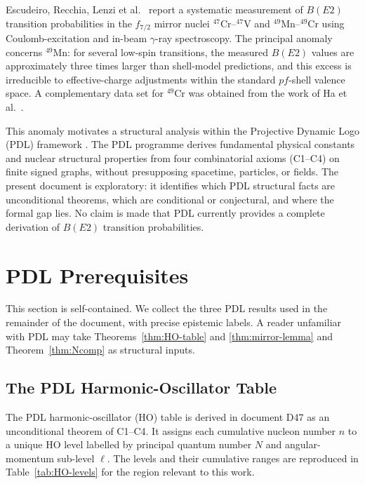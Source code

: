 \documentclass[12pt,a4paper]{article}
\theoremstyle{remark}
\begin{document}
Escudeiro, Recchia, Lenzi et al.\ \cite{Escudeiro_2026} report a systematic measurement of $B(E2)$ transition probabilities in the $f_{7/2}$ mirror nuclei $^{47}$Cr--$^{47}$V and $^{49}$Mn--$^{49}$Cr using Coulomb-excitation and in-beam $\gamma$-ray spectroscopy. The principal anomaly concerns $^{49}$Mn: for several low-spin transitions, the measured $B(E2)$ values are approximately three times larger than shell-model predictions, and this excess is irreducible to effective-charge adjustments within the standard $pf$-shell valence space. A complementary data set for $^{49}$Cr was obtained from the work of Ha et al.\ \cite{Ha_2021}.

This anomaly motivates a structural analysis within the Projective Dynamic Logo (PDL) framework \cite{DM_v24}. The PDL programme derives fundamental physical constants and nuclear structural properties from four combinatorial axioms (C1--C4) on finite signed graphs, without presupposing spacetime, particles, or fields. The present document is exploratory: it identifies which PDL structural facts are unconditional theorems, which are conditional or conjectural, and where the formal gap lies. No claim is made that PDL currently provides a complete derivation of $B(E2)$ transition probabilities.

\section{PDL Prerequisites}
\label{sec:prereqs}

This section is self-contained. We collect the three PDL results used in the remainder of the document, with precise epistemic labels. A reader unfamiliar with PDL may take Theorems~\ref{thm:HO-table} and \ref{thm:mirror-lemma} and Theorem~\ref{thm:Ncomp} as structural inputs.

\subsection{The PDL Harmonic-Oscillator Table}
\label{ssec:HO}

The PDL harmonic-oscillator (HO) table is derived in document D47 as an unconditional theorem of C1--C4. It assigns each cumulative nucleon number $n$ to a unique HO level labelled by principal quantum number $N$ and angular-momentum sub-level $\ell$. The levels and their cumulative ranges are reproduced in Table~\ref{tab:HO-levels} for the region relevant to this work.
\end{document}
